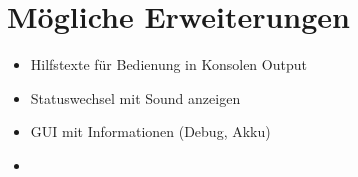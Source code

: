 \section{Mögliche Erweiterungen}
\begin{itemize}
	\item Hilfstexte für Bedienung in Konsolen Output
	\item Statuswechsel mit Sound anzeigen
	\item GUI mit Informationen (Debug, Akku)
	\item 
\end{itemize}
